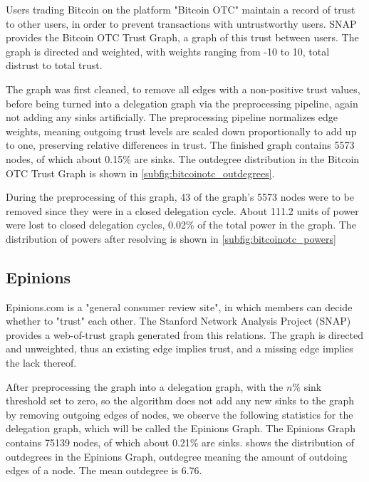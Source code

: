 Users trading Bitcoin on the platform "Bitcoin OTC" maintain a record of trust to other users, in order to prevent transactions with untrustworthy users. SNAP provides the Bitcoin OTC Trust Graph, a graph of this trust between users. \cite{kumar2016edge, kumar2018rev2} The graph is directed and weighted, with weights ranging from -10 to 10, total distrust to total trust. 

The graph was first cleaned, to remove all edges with a non-positive trust values, before being turned into a delegation graph via the preprocessing pipeline, again not adding any sinks artificially. The preprocessing pipeline normalizes edge weights, meaning outgoing trust levels are scaled down proportionally to add up to one, preserving relative differences in trust. The finished graph contains 5573 nodes, of which about 0.15\% are sinks. The outdegree distribution in the Bitcoin OTC Trust Graph is shown in \cref{subfig:bitcoinotc_outdegrees}.

During the preprocessing of this graph, 43 of the graph's 5573 nodes were to be removed since they were in a closed delegation cycle. About 111.2 units of power were lost to closed delegation cycles,  0.02\% of the total power in the graph. The distribution of powers after resolving is shown in \cref{subfig:bitcoinotc_powers}

\subsection{Epinions}

Epinions.com is a "general consumer review site", in which members can decide whether to "trust" each other. The Stanford Network Analysis Project (SNAP) provides a web-of-trust graph generated from this relations. \cite{richardsonTrustManagementSemantic2003} The graph is directed and unweighted, thus an existing edge implies trust, and a missing edge implies the lack thereof.

After preprocessing the graph into a delegation graph, with the $n\%$ sink threshold set to zero, so the algorithm does not add any new sinks to the graph by removing outgoing edges of nodes, we observe the following statistics for the delegation graph, which will be called the Epinions Graph. The Epinions Graph contains 75139 nodes, of which about 0.21\% are sinks.  shows the distribution of outdegrees in the Epinions Graph, outdegree meaning the amount of outdoing edges of a node. The mean outdegree is 6.76.

